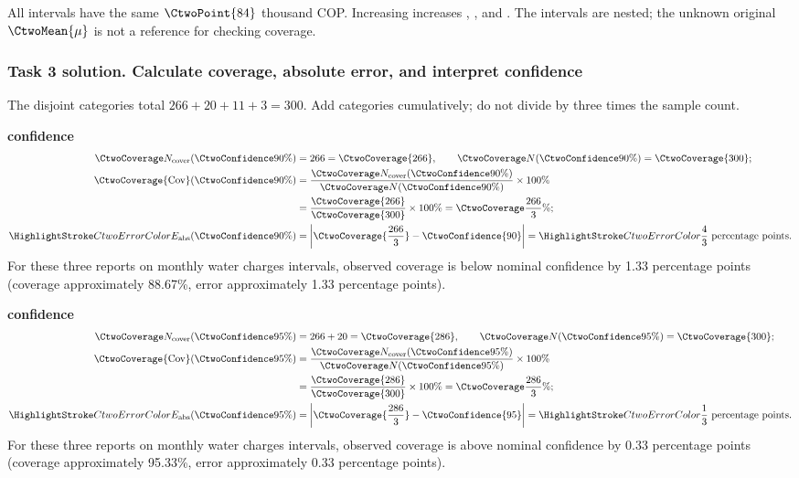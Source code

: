 All intervals have the same  $\CtwoPoint{84}$ thousand COP. Increasing  increases , , and . The intervals are nested; the unknown original $\CtwoMean{\mu}$ is not a reference for checking coverage.
\par\vspace{3mm}
\clearpage
\subsubsection*{Task 3 solution. Calculate coverage, absolute error, and interpret confidence}
\label{sol:c2-advanced-d-c}
The disjoint categories total $266+20+11+3=300$. Add categories cumulatively; do not divide by three times the sample count.

\textbf{ confidence}\nopagebreak[4]
\begin{align*}
\CtwoCoverCount(\CtwoConfidence{90\%})&=266=\CtwoCoverage{266},
\qquad\CtwoTotalCount(\CtwoConfidence{90\%})=\CtwoCoverage{300};\\
\CtwoCoverage{\mathrm{Cov}}(\CtwoConfidence{90\%})
&=\frac{\CtwoCoverCount(\CtwoConfidence{90\%})}{\CtwoTotalCount(\CtwoConfidence{90\%})}\times100\%
\\
&=\frac{\CtwoCoverage{266}}{\CtwoCoverage{300}}\times100\%=\CtwoCoverage{\frac{266}{3}\%};\\
\CtwoError{E_{\rm abs}}(\CtwoConfidence{90\%})
&=\left|\CtwoCoverage{\frac{266}{3}}-\CtwoConfidence{90}\right|=\CtwoError{\frac{4}{3}}\ \text{percentage points}.
\end{align*}
For these three reports on monthly water charges intervals, observed coverage is below nominal confidence by 1.33 percentage points (coverage approximately 88.67\%, error approximately 1.33 percentage points).

\textbf{ confidence}\nopagebreak[4]
\begin{align*}
\CtwoCoverCount(\CtwoConfidence{95\%})&=266+20=\CtwoCoverage{286},
\qquad\CtwoTotalCount(\CtwoConfidence{95\%})=\CtwoCoverage{300};\\
\CtwoCoverage{\mathrm{Cov}}(\CtwoConfidence{95\%})
&=\frac{\CtwoCoverCount(\CtwoConfidence{95\%})}{\CtwoTotalCount(\CtwoConfidence{95\%})}\times100\%
\\
&=\frac{\CtwoCoverage{286}}{\CtwoCoverage{300}}\times100\%=\CtwoCoverage{\frac{286}{3}\%};\\
\CtwoError{E_{\rm abs}}(\CtwoConfidence{95\%})
&=\left|\CtwoCoverage{\frac{286}{3}}-\CtwoConfidence{95}\right|=\CtwoError{\frac{1}{3}}\ \text{percentage points}.
\end{align*}
For these three reports on monthly water charges intervals, observed coverage is above nominal confidence by 0.33 percentage points (coverage approximately 95.33\%, error approximately 0.33 percentage points).

